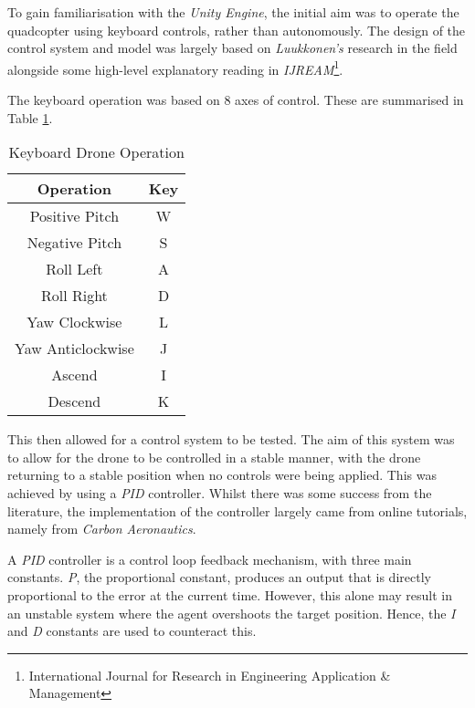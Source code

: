 \documentclass{article}
\begin{document}
To gain familiarisation with the \emph{Unity Engine}, the initial aim was to operate the quadcopter using keyboard controls, rather than autonomously. The design of the control system and model was largely based on \emph{Luukkonen's} research in the field\cite{Luukkonen} alongside some high-level explanatory reading in \emph{IJREAM}\footnote{International Journal for Research in Engineering Application \& Management}\cite{Tatale}.

The keyboard operation was based on 8 axes of control. These are summarised in Table \ref{tab:keyboard-operation}.

\begin{table}[H]
    \centering
    \begin{tabular}{|c|c|}
        \hline
        \textbf{Operation} & \textbf{Key} \\
        \hline
        Positive Pitch & W \\
        \hline
        Negative Pitch & S \\
        \hline
        Roll Left & A \\
        \hline
        Roll Right & D \\
        \hline
        Yaw Clockwise & L \\
        \hline
        Yaw Anticlockwise & J \\
        \hline
        Ascend & I \\
        \hline
        Descend & K \\
        \hline
    \end{tabular}
    \caption{Keyboard Drone Operation}
    \label{tab:keyboard-operation}
\end{table}

This then allowed for a control system to be tested. The aim of this system was to allow for the drone to be controlled in a stable manner, with the drone returning to a stable position when no controls were being applied. This was achieved by using a \emph{PID} controller\cite[p.72-73]{Szafranski}. Whilst there was some success from the literature, the implementation of the controller largely came from online tutorials, namely from \emph{Carbon Aeronautics}\cite{Carbon}.

A \emph{PID} controller is a control loop feedback mechanism, with three main constants. \emph{P}, the proportional constant, produces an output that is directly proportional to the error at the current time. However, this alone may result in an unstable system where the agent overshoots the target position. Hence, the \emph{I} and \emph{D} constants are used to counteract this.
\end{document}
